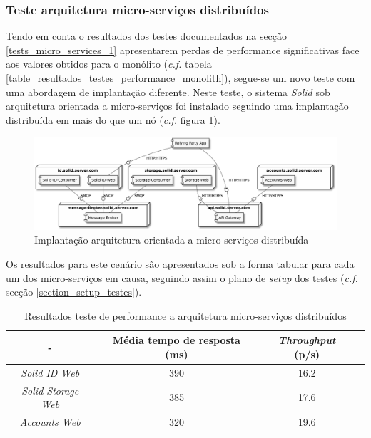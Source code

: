 \subsubsection*{Teste arquitetura micro-serviços distribuídos \label{tests_micro_services_2}}

Tendo em conta o resultados dos testes documentados na secção \ref{tests_micro_services_1} apresentarem perdas de performance significativas face aos valores obtidos para o monólito (\emph{c.f.} tabela \ref{table_resultados_testes_performance_monolith}), segue-se um novo teste com uma abordagem de implantação diferente.
Neste teste, o sistema \emph{Solid} sob arquitetura orientada a micro-serviços foi instalado seguindo uma implantação distribuída em mais do que um nó (\emph{c.f.} figura \ref{figure_solid_micro_services_multiples_vps_implantation_diagram}).

\begin{figure}[H]
    \begin{center}
    \includegraphics[width=1 \textwidth]{figures/microservices_tests2.eps}
    \caption{Implantação arquitetura orientada a micro-serviços distribuída}
    \label{figure_solid_micro_services_multiples_vps_implantation_diagram}
    \end{center}
\end{figure}


Os resultados para este cenário são apresentados sob a forma tabular para cada um dos micro-serviços em causa, seguindo assim o plano de \emph{setup} dos testes (\emph{c.f.} secção \ref{section_setup_testes}).

\begin{table}[h]
\centering
\caption{Resultados teste de performance a arquitetura micro-serviços distribuídos}
\label{r_t_m_s_2}
\vspace{0.5cm}
\begin{tabular}{c|c|c|c} 
 - & Média tempo de resposta (ms) & \emph{Throughput} (p/s) \\
\hline                          
\emph{Solid ID Web} & 390 & 16.2 \\
\emph{Solid Storage Web} & 385 & 17.6 \\
\emph{Accounts Web} & 320 & 19.6 \\
\end{tabular}
\end{table}

